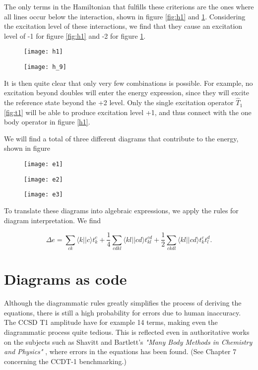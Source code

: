 The only terms in the Hamiltonian that fulfills these criterions are the ones where all lines occur below the interaction, shown in figure \ref{fig:h1} and \ref{fig:h_9}. Considering the excitation level of these interactions, we find that they cause an excitation level of -1 for figure \ref{fig:h1} and -2 for figure \ref{fig:h_9}.

\begin{figure}[!h9h1]
  \centering
  \texttt{[image: h1]}
  \caption{}\label{fig:h1}
\endminipage\hfill
{}
  \centering
  \texttt{[image: h\_9]}
  \caption{}\label{fig:h_9}
\endminipage\hfill
\end{figure}

It is then quite clear that only very few combinations is possible.  For example, no excitation beyond doubles will enter the energy expression, since they will excite the reference state beyond the +2 level. Only the single excitation operator $\hat{T}_1$ \ref{fig:t1} will be able to produce excitation level +1, and thus connect with the one body operator in figure \ref{h1}. 

We will find a total of three different diagrams that contribute to the energy, shown in figure

\begin{figure}[!ccenergy]
  \centering
  \texttt{[image: e1]}
  \caption{}\label{fig:e1}
\endminipage\hfill
{}
  \centering
  \texttt{[image: e2]}
  \caption{}\label{fig:e2}
\endminipage\hfill
{}
  \centering
  \texttt{[image: e3]}
  \caption{}\label{fig:e3}
\endminipage\hfill
\end{figure}
 
To translate these diagrams into algebraic expressions, we apply the rules for diagram interpretation. We find 

\begin{equation}
\Delta e =  \sum_{ck} \langle k || c \rangle t_{k}^{c}+\frac{1}{4} \sum_{cdkl} \langle kl || cd \rangle t_{kl}^{cd}+\frac{1}{2} \sum_{ckdl} \langle kl || cd \rangle t_{k}^{c} t_{l}^{d}.
\label{eqn:c_energy}
\end{equation}

\section{Diagrams as code}

Although the diagrammatic rules greatly simplifies the process of deriving the equations, there is still a high probability for errors due to human inaccuracy. The CCSD T1 amplitude have for example 14 terms, making even the diagrammatic process quite tedious. This is reflected even in authoritative works on the subjects such as Shavitt and Bartlett's \emph{"Many Body Methods in Chemistry and Physics"} \cite{ShavittBartlett2009}, where errors in the equations has been found. (See Chapter 7 concerning the CCDT-1 benchmarking.)

